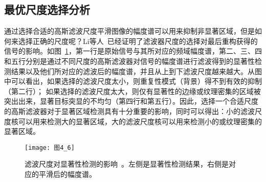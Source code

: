 \subsection{最优尺度选择分析}
\label{4_1_3}

通过选择合适的高斯滤波尺度平滑图像的幅度谱可以用来抑制非显著区域，但是如何来选择正确的尺度呢？Li等人~\cite{LiJianTPAMI2013Scale}已经证明了滤波器尺度的选择对最后重构获得的信号的影响。如图~\ref{图4_6}，第一行是原始信号与其所对应的频域幅度谱，第二、三、四和五行分别是通过不同尺度的高斯滤波器对信号的幅度谱进行滤波得到的显著性检测结果以及他们所对应的滤波后的幅度谱，并且从上到下滤波尺度越来越大。从图中可以看出，如果选择的滤波尺度太小，则重复性模式（背景）得不到有效的抑制（第二行）； 如果选择的滤波尺度太大，则仅有显著性的边缘或纹理密集的区域被突出出来，显著目标突显的不均匀（第四行和第五行）。因此，选择一个合适尺度的高斯滤波器对于显著区域检测具有十分重要的影响，同时可以得出：小的滤波尺度核可以用来检测大的显著区域，大的滤波尺度核可以用来检测小的或纹理密集的显著区域。
\begin{figure}[h]
  \centering
  \texttt{[image: 图4\_6]}
  \caption{滤波尺度对显著性检测的影响~\cite{LiJianTPAMI2013Scale}。左侧是显著性检测结果，右侧是对应的平滑后的幅度谱。}   
  \label{图4_6} 
\end{figure}

